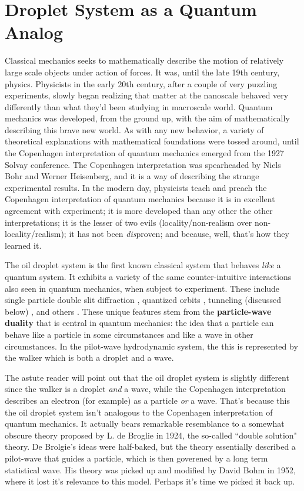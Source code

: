            
\section{Droplet System as a Quantum Analog}   

Classical mechanics seeks to mathematically describe the motion of relatively large scale objects under action of forces. It was, until the late 19th century, physics. Physicists in the early 20th century, after a couple of very puzzling experiments, slowly began realizing that matter at the nanoscale behaved very differently than what they'd been studying in macroscale world. Quantum mechanics was developed, from the ground up, with the aim of mathematically describing this brave new world. As with any new behavior, a variety of theoretical explanations with mathematical foundations were tossed around, until the Copenhagen interpretation of quantum mechanics emerged from the 1927 Solvay conference. The Copenhagen interpretation was spearheaded by Niels Bohr and Werner Heisenberg, and it is a way of describing the strange experimental results. In the modern day, physicists teach and preach the Copenhagen interpretation of quantum mechanics because it is in excellent agreement with experiment; it is more developed than any other the other interpretations; it is the lesser of two evils (locality/non-realism over non-locality/realism); it has not been \textit{dis}proven; and because, well, that's how they learned it. 

The oil droplet system is the first known classical system that behaves \textit{like} a quantum system. It exhibits a variety of the same counter-intuitive interactions also seen in quantum mechanics, when subject to experiment. These include single particle double slit diffraction , quantized orbits , tunneling (discussed below) , and others . These unique features stem from the \textbf{particle-wave duality} that is central in quantum mechanics: the idea that a particle can behave like a particle in some circumstances and like a wave in other circumstances. In the pilot-wave hydrodynamic system, the this is represented by the walker which is both a droplet and a wave.

The astute reader will point out that the oil droplet system is slightly different since the walker is a droplet \textit{and} a wave, while the Copenhagen interpretation describes an electron (for example) as a particle \textit{or} a wave. That's because this the oil droplet system isn't analogous to the Copenhagen interpretation of quantum mechanics. It actually bears remarkable resemblance to a somewhat obscure theory proposed by L. de Broglie in 1924, the so-called ``double solution" theory. De Brolgie's ideas were half-baked, but the theory essentially described a pilot-wave that guides a particle, which is then goverened by a long term statistical wave. His theory was picked up and modified by David Bohm in 1952, where it lost it's relevance to this model. Perhaps it's time we picked it back up. 


